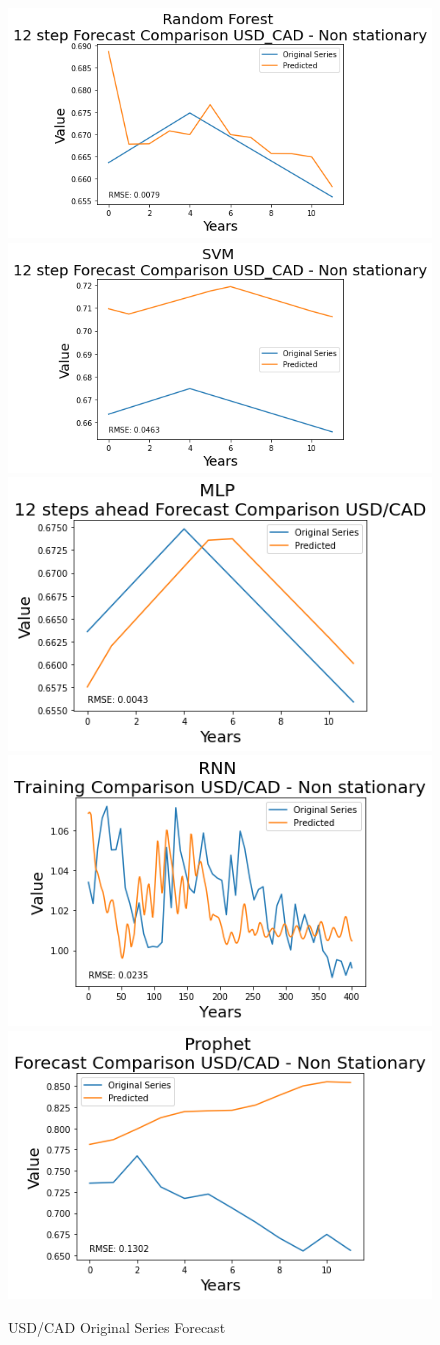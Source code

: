 \documentclass[10pt,twocolumn,letterpaper]{article}
\begin{document}
	\begin{figure}[h]
		\centering
		\includegraphics[width=0.45\linewidth]{../img/RandomForest/usd_cad_for}
		\includegraphics[width=0.45\linewidth]{../img/SVM/usd_cad_for}
		\includegraphics[width=0.45\linewidth]{../img/MLP/usd_cad_for}
		\includegraphics[width=0.45\linewidth]{../img/RNN/usd_cad_for}
		\includegraphics[width=0.45\linewidth]{../img/Prophet/usd_cad_for}
		\caption{USD/CAD Original Series Forecast}
		\label{fig:usd_cadforecast}
	\end{figure}
	
\end{document}
